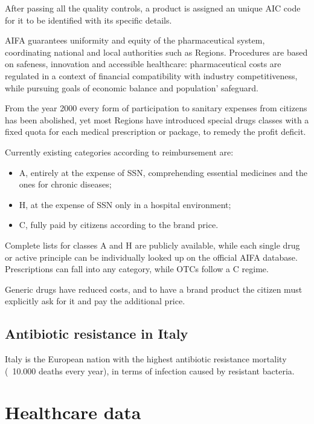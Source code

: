 After passing all the quality controls, a product is assigned an unique AIC code for it to be identified with its specific details.

AIFA guarantees uniformity and equity of the pharmaceutical system, coordinating national and local authorities such as Regions. Procedures are based on safeness, innovation and accessible healthcare: pharmaceutical costs are regulated in a context of financial compatibility with industry competitiveness, while pursuing goals of economic balance and population' safeguard.

From the year 2000 every form of participation to sanitary expenses from citizens has been abolished\cite{ticket}, yet most Regions have introduced special drugs classes with a fixed quota for each medical prescription or package, to remedy the profit deficit. 

Currently existing categories according to reimbursement are\cite{classi}:
\begin{itemize}
	\item A, entirely at the expense of SSN, comprehending essential medicines and the ones for chronic diseases;
	\item H, at the expense of SSN only in a hospital environment;
	\item C, fully paid by citizens according to the brand price.
\end{itemize}
Complete lists for classes A and H are publicly available, while each single drug or active principle can be individually looked up on the official AIFA database. Prescriptions can fall into any category, while OTCs follow a C regime. 

Generic drugs have reduced costs, and to have a brand product the citizen must explicitly ask for it and pay the additional price\cite{ticket}.

\subsection{Antibiotic resistance in Italy}
Italy is the European nation with the highest antibiotic resistance mortality (~10.000 deaths every year), in terms of infection caused by resistant bacteria\cite{repubblica}. 

\section{Healthcare data}

